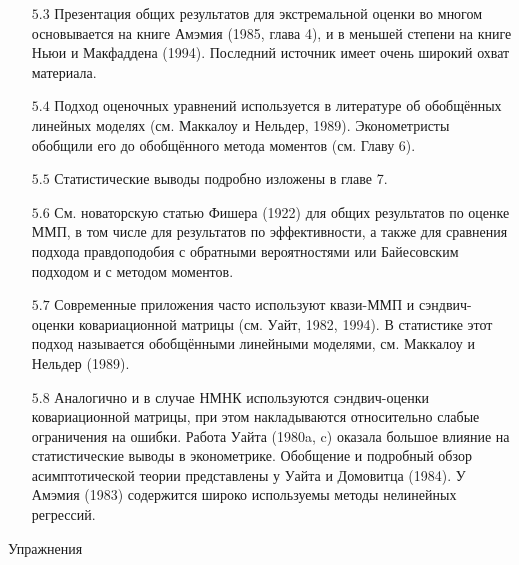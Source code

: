 \begin{enumerate}
\item [$5.3$] Презентация общих результатов для экстремальной оценки во многом основывается на книге Амэмия (1985, глава 4), и в меньшей степени на книге Ньюи и Макфаддена (1994). Последний источник имеет очень широкий охват материала.
\item [$5.4$] Подход оценочных уравнений используется в литературе об обобщённых линейных моделях (см. Маккалоу и Нельдер, 1989). Эконометристы обобщили его до обобщённого метода моментов (см. Главу 6).
\item [$5.5$] Статистические выводы подробно изложены в главе 7.
\item [$5.6$] См. новаторскую статью Фишера (1922) для общих результатов по оценке ММП, в том числе для результатов по эффективности, а также для сравнения подхода правдоподобия с обратными вероятностями или Байесовским подходом и с методом моментов.
\item [$5.7$] Современные приложения часто используют квази-ММП и сэндвич-оценки ковариационной матрицы (см. Уайт, 1982, 1994). В статистике этот подход называется обобщёнными линейными моделями,  см. Маккалоу и Нельдер (1989).
\item [$5.8$] Аналогично и в случае НМНК используются сэндвич-оценки ковариационной матрицы, при этом накладываются относительно слабые ограничения на ошибки. Работа Уайта (1980a, c) оказала большое влияние на статистические выводы в эконометрике. Обобщение и подробный обзор асимптотической теории представлены у Уайта и Домовитца (1984). У Амэмия (1983) содержится широко используемы методы нелинейных регрессий.
\end{enumerate}

\begin{center}
Упражнения
\end{center}

